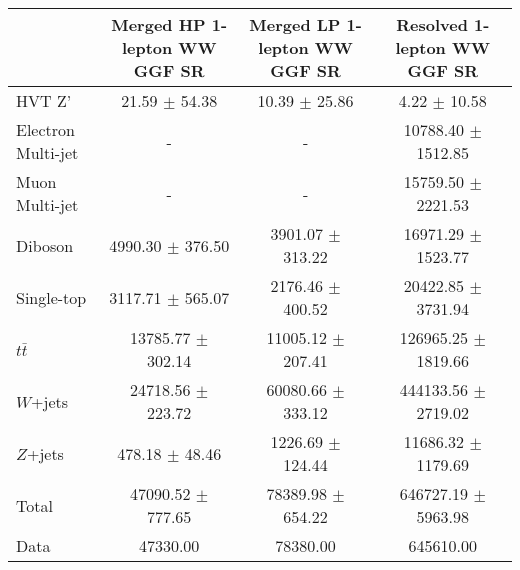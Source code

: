 \begin{tabular}{|l|c|c|c|}
\hline
	  &	Merged HP 1-lepton WW GGF SR &	Merged LP 1-lepton WW GGF SR &	Resolved 1-lepton WW GGF SR \\\hline 
	HVT Z' &	21.59 $\pm$ 54.38 &	10.39 $\pm$ 25.86 &	4.22 $\pm$ 10.58 \\\hline 
	Electron Multi-jet &	- &	- &	10788.40 $\pm$ 1512.85 \\\hline 
	Muon Multi-jet &	- &	- &	15759.50 $\pm$ 2221.53 \\\hline 
	Diboson &	4990.30 $\pm$ 376.50 &	3901.07 $\pm$ 313.22 &	16971.29 $\pm$ 1523.77 \\\hline 
	Single-top &	3117.71 $\pm$ 565.07 &	2176.46 $\pm$ 400.52 &	20422.85 $\pm$ 3731.94 \\\hline 
	$t\bar{t}$ &	13785.77 $\pm$ 302.14 &	11005.12 $\pm$ 207.41 &	126965.25 $\pm$ 1819.66 \\\hline 
	$W$+jets &	24718.56 $\pm$ 223.72 &	60080.66 $\pm$ 333.12 &	444133.56 $\pm$ 2719.02 \\\hline 
	$Z$+jets &	478.18 $\pm$ 48.46 &	1226.69 $\pm$ 124.44 &	11686.32 $\pm$ 1179.69 \\\hline 
	Total &	47090.52 $\pm$ 777.65 &	78389.98 $\pm$ 654.22 &	646727.19 $\pm$ 5963.98 \\\hline 
	Data &	47330.00 &	78380.00 &	645610.00 \\\hline 
\end{tabular}
